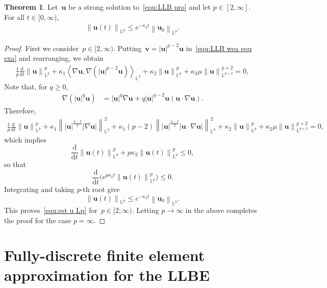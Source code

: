 \documentclass[11pt,reqno]{amsart}
\theoremstyle{definition}
\newtheorem{theorem}{Theorem}[section]
\numberwithin{equation}{section}
\newcommand{\bff}{\boldsymbol}
\newcommand{\bb}{\mathbb}
\newcommand{\ddt}{\frac{\mathrm{d}}{\mathrm{d}t}}
\newcommand{\norm}[2]{\left\|{#1}\right\|_{#2}}
\newcommand{\inpro}[2]{\left\langle#1,#2\right\rangle}
\newcommand{\abs}[1]{\left|{#1}\right|}
\begin{document}
\begin{theorem}\label{the:ut inf}
Let~$\bff{u}$ be a strong solution to~\eqref{equ:LLB pro} and let $p\in
[2,\infty]$. For all $t\in [0,\infty)$,
\begin{align}\label{equ:est u Lp}
	\norm{\bff{u}(t)}{\bb{L}^p} \leq e^{-\kappa_2 t} \norm{\bff{u}_0}{\bb{L}^p}.
\end{align}
\end{theorem}

\begin{proof}
First we consider~$p\in[2,\infty)$. Putting~$\bff{v}=|\bff{u}|^{p-2}
\bff{u}$ in~\eqref{equ:LLB wea equ exa} and rearranging, we obtain
\begin{align*}
	\frac{1}{p} \ddt \norm{\bff{u}}{\bb{L}^p}^p
	+
	\kappa_1 
	\inpro{\nabla \bff{u}}{\nabla (\abs{\bff{u}}^{p-2} \bff{u})}_{\bb{L}^2}
	+
	\kappa_2 \norm{\bff{u}}{\bb{L}^p}^p
	+
	\kappa_2\mu \norm{\bff{u}}{\bb{L}^{p+2}}^{p+2}
	=
	0,
\end{align*}
Note that, for $q\geq 0$,
\begin{align*}
	\nabla (\abs{\bff{u}}^q \bff{u})
	&=
	\abs{\bff{u}}^q \nabla \bff{u}
	+
	q \abs{\bff{u}}^{q-2} \bff{u} (\bff{u}\cdot \nabla \bff{u}).
\end{align*}
Therefore,
\begin{align*}
	\frac{1}{p} \ddt \norm{\bff{u}}{\bb{L}^p}^p
	+
	\kappa_1 \norm{|\bff{u}|^{\frac{p-2}{2}} |\nabla \bff{u}|}{\bb{L}^2}^2
	+
	\kappa_1 (p-2) \norm{|\bff{u}|^{\frac{p-4}{2}} |\bff{u}\cdot\nabla\bff{u}|}{\bb{L}^2}^2
	+
	\kappa_2 \norm{\bff{u}}{\bb{L}^p}^p
	+
	\kappa_2\mu \norm{\bff{u}}{\bb{L}^{p+2}}^{p+2}
	=
	0,
\end{align*}
which implies
\[
\ddt \norm{\bff{u}(t)}{\bb{L}^p}^p + p \kappa_2 \norm{\bff{u}(t)}{\bb{L}^p}^p
\leq 0,
\]
so that
\[
\ddt
\Big(
e^{p\kappa_2 t} \norm{\bff{u}(t)}{\bb{L}^p}^p
\Big)
\le 0.
\]
Integrating and taking $p$-th root give
\[
\norm{\bff{u}(t)}{\bb{L}^p}
\leq
e^{-\kappa_2 t} \norm{\bff{u}_0}{\bb{L}^p}.
\]
This proves~\eqref{equ:est u Lp} for~$p\in[2,\infty)$. Letting $p\to \infty$ in
the above completes the proof for the case $p=\infty$.
\end{proof}


\section{Fully-discrete finite element approximation for the LLBE}\label{sec:fem LLB}
\end{document}
